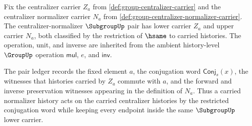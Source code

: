 \begin{definition}
\label{def:subgroup-centralizer-normalizer-pair}
Fix the centralizer carrier $Z_a$ from
\autoref{def:group-centralizer-carrier} and the centralizer normalizer carrier
$N_a$ from \autoref{def:group-centralizer-normalizer-carrier}. The
centralizer-normalizer $\SubgroupUp$ pair has lower carrier $Z_a$ and upper
carrier $N_a$, both classified by the restriction of $\hsame$ to carried
histories. The operation, unit, and inverse are inherited from the ambient
history-level $\GroupUp$ operation $\mathsf{mul}$, $e$, and $\mathsf{inv}$.

The pair ledger records the fixed element $a$, the conjugation word
$\mathsf{Conj}_s(x)$, the witnesses that histories carried by $Z_a$ commute
with $a$, and the forward and inverse preservation witnesses appearing in the
definition of $N_a$. Thus a carried normalizer history acts on the carried
centralizer histories by the restricted conjugation word while keeping every
endpoint inside the same $\SubgroupUp$ lower carrier.
\end{definition}

